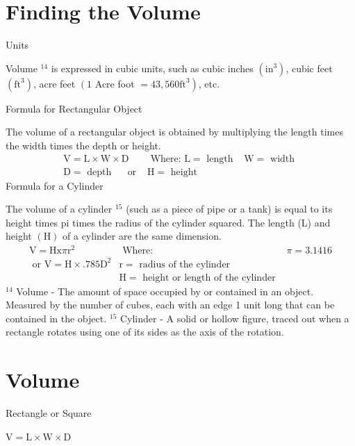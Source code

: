 \documentclass[10pt]{article}
\begin{document}
\section{Finding the Volume}
Units

Volume ${ }^{14}$ is expressed in cubic units, such as cubic inches $\left(\mathrm{in}^{3}\right)$, cubic feet $\left(\mathrm{ft}^{3}\right)$, acre feet $\left(1\right.$ Acre foot $\left.=43,560 \mathrm{ft}^{3}\right)$, etc.

Formula for Rectangular Object

The volume of a rectangular object is obtained by multiplying the length times the width times the depth or height.
$$
\begin{array}{lll}
\mathrm{V}=\mathrm{L} \times \mathrm{W} \times \mathrm{D} & \text { Where: } \mathrm{L}=\text { length } & \mathrm{W}=\text { width } \\
\mathrm{D}=\text { depth } \quad \text { or } & \mathrm{H}=\text { height }
\end{array}
$$
Formula for a Cylinder

The volume of a cylinder ${ }^{15}$ (such as a piece of pipe or a tank) is equal to its height times pi times the radius of the cylinder squared. The length (L) and height $(\mathrm{H})$ of a cylinder are the same dimension.
$$
\begin{array}{lll}
\mathrm{V}=\mathrm{Hx} \pi \mathrm{r}^{2} & \text { Where: } & \pi=3.1416 \\
\text { or } \mathrm{V}=\mathrm{H} \times .785 \mathrm{D}^{2} & \mathrm{r}=\text { radius of the cylinder } \\
& \mathrm{H}=\text { height or length of the cylinder }
\end{array}
$$
${ }^{14}$ Volume - The amount of space occupied by or contained in an object. Measured by the number of cubes, each with an edge 1 unit long that can be contained in the object. ${ }^{15}$ Cylinder - A solid or hollow figure, traced out when a rectangle rotates using one of its sides as the axis of the rotation.

\section{Volume}
Rectangle or Square

$\mathrm{V}=\mathrm{L} \times \mathrm{W} \times \mathrm{D}$
\end{document}
